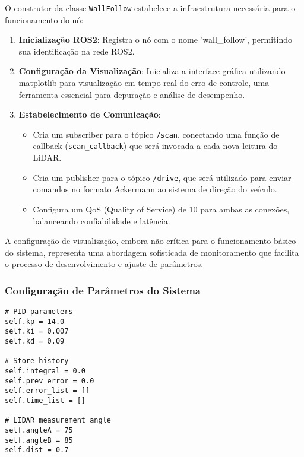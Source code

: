 O construtor da classe \texttt{WallFollow} estabelece a infraestrutura
necessária para o funcionamento do nó:

\begin{enumerate}
    \item \textbf{Inicialização ROS2}: Registra o nó com o nome 'wall\_follow', permitindo sua identificação na rede ROS2.

    \item \textbf{Configuração da Visualização}: Inicializa a interface gráfica utilizando matplotlib para visualização em tempo real do erro de controle, uma ferramenta essencial para depuração e análise de desempenho.

    \item \textbf{Estabelecimento de Comunicação}:
          \begin{itemize}
              \item Cria um subscriber para o tópico \texttt{/scan}, conectando uma função de
                    callback (\texttt{scan\_callback}) que será invocada a cada nova leitura do
                    LiDAR.
              \item Cria um publisher para o tópico \texttt{/drive}, que será utilizado para enviar
                    comandos no formato Ackermann ao sistema de direção do veículo.
              \item Configura um QoS (Quality of Service) de 10 para ambas as conexões, balanceando
                    confiabilidade e latência.
          \end{itemize}
\end{enumerate}

A configuração de visualização, embora não crítica para o funcionamento básico
do sistema, representa uma abordagem sofisticada de monitoramento que facilita
o processo de desenvolvimento e ajuste de parâmetros.

\subsubsection{Configuração de Parâmetros do Sistema}

\begin{verbatim}
# PID parameters
self.kp = 14.0
self.ki = 0.007
self.kd = 0.09

# Store history
self.integral = 0.0
self.prev_error = 0.0
self.error_list = []
self.time_list = []

# LIDAR measurement angle
self.angleA = 75
self.angleB = 85 
self.dist = 0.7
\end{verbatim}

